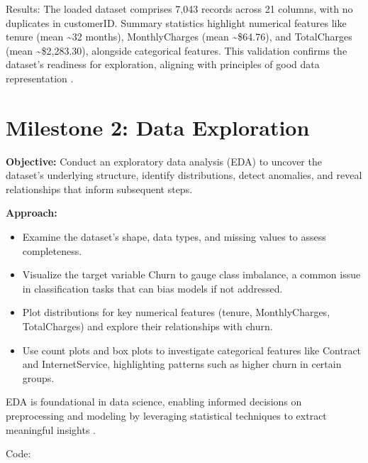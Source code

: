 \documentclass[preprint, 3p,
authoryear]{elsarticle} %
\providecommand{\tightlist}{%
  \setlength{\itemsep}{0pt}\setlength{\parskip}{0pt}}
\begin{document}
Results: The loaded dataset comprises 7,043 records across 21 columns,
with no duplicates in customerID. Summary statistics highlight numerical
features like tenure (mean \textasciitilde32 months), MonthlyCharges
(mean \textasciitilde\$64.76), and TotalCharges (mean
\textasciitilde\$2,283.30), alongside categorical features. This
validation confirms the dataset's readiness for exploration, aligning
with principles of good data representation \citep{foxwell2020creating}.

\section{Milestone 2: Data
Exploration}\label{milestone-2-data-exploration}

\textbf{Objective:} Conduct an exploratory data analysis (EDA) to
uncover the dataset's underlying structure, identify distributions,
detect anomalies, and reveal relationships that inform subsequent steps.

\textbf{Approach:}

\begin{itemize}
\tightlist
\item
  Examine the dataset's shape, data types, and missing values to assess
  completeness.
\item
  Visualize the target variable Churn to gauge class imbalance, a common
  issue in classification tasks that can bias models if not addressed.
\item
  Plot distributions for key numerical features (tenure, MonthlyCharges,
  TotalCharges) and explore their relationships with churn.
\item
  Use count plots and box plots to investigate categorical features like
  Contract and InternetService, highlighting patterns such as higher
  churn in certain groups.
\end{itemize}

EDA is foundational in data science, enabling informed decisions on
preprocessing and modeling by leveraging statistical techniques to
extract meaningful insights \citep{hanaexploring}.

Code:
\end{document}
